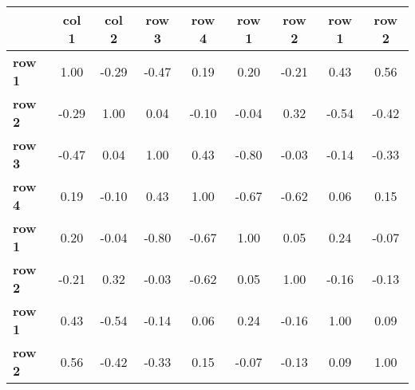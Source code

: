 \begin{tiny}\begin{tabular}{|l|c|c|c|c|c|c|c|c|}
\hline
&\textbf{col 1}&\textbf{col 2}&\textbf{row 3}&\textbf{row 4}&\textbf{row 1}&\textbf{row 2}&\textbf{row 1}&\textbf{row 2}\\\hline
\textbf{row 1}&1.00&-0.29&-0.47&0.19&0.20&-0.21&0.43&0.56\\\hline
\textbf{row 2}&-0.29&1.00&0.04&-0.10&-0.04&0.32&-0.54&-0.42\\\hline
\textbf{row 3}&-0.47&0.04&1.00&0.43&-0.80&-0.03&-0.14&-0.33\\\hline
\textbf{row 4}&0.19&-0.10&0.43&1.00&-0.67&-0.62&0.06&0.15\\\hline
\textbf{row 1}&0.20&-0.04&-0.80&-0.67&1.00&0.05&0.24&-0.07\\\hline
\textbf{row 2}&-0.21&0.32&-0.03&-0.62&0.05&1.00&-0.16&-0.13\\\hline
\textbf{row 1}&0.43&-0.54&-0.14&0.06&0.24&-0.16&1.00&0.09\\\hline
\textbf{row 2}&0.56&-0.42&-0.33&0.15&-0.07&-0.13&0.09&1.00\\\hline
\end{tabular}
\end{tiny}